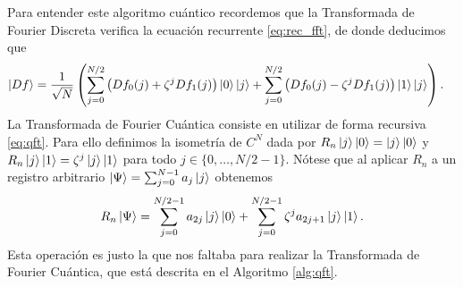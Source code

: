 \documentclass{article}
\begin{document}
Para entender este algoritmo cuántico recordemos que la Transformada de Fourier Discreta verifica la ecuación recurrente  \eqref{eq:rec_fft}, 
de donde deducimos que
\begin{equation} \label{eq:qft}
\begin{aligned}
    \ket{Df} & %
     = \frac{1}{\sqrt{N}} \left(\sum_{j = 0}^{N/2} \left(Df_0(j) +  \zeta^j Df_1(j)\right) \ket{0} \ket{j} + 
     \sum_{j = 0}^{N/2} \left(Df_0(j)  -  \zeta^j Df_1(j)\right) \ket{1} \ket{j} \right). %
\end{aligned}
\end{equation}
La Transformada de Fourier Cuántica consiste en utilizar de forma recursiva \eqref{eq:qft}. Para ello definimos la isometría de $C^N$ dada por $R_n \ket{j}\ket{0} = \ket{j}\ket{0}$ y $R_n \ket{j}\ket{1} = \zeta^j \ket{j}\ket{1}$ para todo $j \in \{0, \ldots, N/2-1\}$. Nótese que al aplicar $R_n$ a un registro arbitrario $\ket{\Psi} = \sum_{j = 0}^{N-1} a_j \ket{j}$ obtenemos
\begin{equation}
    R_n \ket{\Psi} = \sum_{j = 0}^{N/2-1} a_{2j} \ket{j}\ket{0} + \sum_{j = 0}^{N/2-1} \zeta^j a_{2j+1}  \ket{j}\ket{1}.
\end{equation}
Esta operación es justo la que nos faltaba para realizar la Transformada de Fourier Cuántica, que está descrita en el Algoritmo \ref{alg:qft}. 
\end{document}
